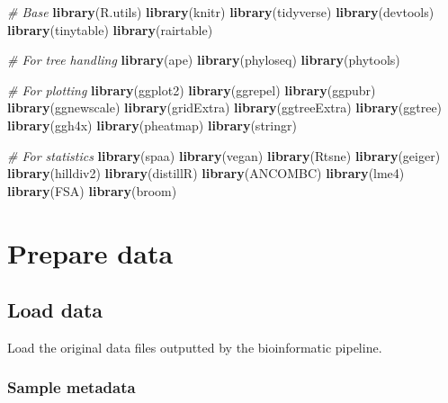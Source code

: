 \documentclass[
]{book}
\newenvironment{Shaded}{\begin{snugshade}}{\end{snugshade}}
\newcommand{\CommentTok}[1]{\textcolor[rgb]{0.56,0.35,0.01}{\textit{#1}}}
\newcommand{\FunctionTok}[1]{\textcolor[rgb]{0.13,0.29,0.53}{\textbf{#1}}}
\newcommand{\NormalTok}[1]{#1}
\begin{document}
\begin{Shaded}
\begin{Highlighting}[]
\CommentTok{\# Base}
\FunctionTok{library}\NormalTok{(R.utils)}
\FunctionTok{library}\NormalTok{(knitr)}
\FunctionTok{library}\NormalTok{(tidyverse)}
\FunctionTok{library}\NormalTok{(devtools)}
\FunctionTok{library}\NormalTok{(tinytable)}
\FunctionTok{library}\NormalTok{(rairtable)}

\CommentTok{\# For tree handling}
\FunctionTok{library}\NormalTok{(ape)}
\FunctionTok{library}\NormalTok{(phyloseq)}
\FunctionTok{library}\NormalTok{(phytools)}

\CommentTok{\# For plotting}
\FunctionTok{library}\NormalTok{(ggplot2)}
\FunctionTok{library}\NormalTok{(ggrepel)}
\FunctionTok{library}\NormalTok{(ggpubr)}
\FunctionTok{library}\NormalTok{(ggnewscale)}
\FunctionTok{library}\NormalTok{(gridExtra)}
\FunctionTok{library}\NormalTok{(ggtreeExtra)}
\FunctionTok{library}\NormalTok{(ggtree)}
\FunctionTok{library}\NormalTok{(ggh4x)}
\FunctionTok{library}\NormalTok{(pheatmap)}
\FunctionTok{library}\NormalTok{(stringr)}

\CommentTok{\# For statistics}
\FunctionTok{library}\NormalTok{(spaa)}
\FunctionTok{library}\NormalTok{(vegan)}
\FunctionTok{library}\NormalTok{(Rtsne)}
\FunctionTok{library}\NormalTok{(geiger)}
\FunctionTok{library}\NormalTok{(hilldiv2)}
\FunctionTok{library}\NormalTok{(distillR)}
\FunctionTok{library}\NormalTok{(ANCOMBC)}
\FunctionTok{library}\NormalTok{(lme4)}
\FunctionTok{library}\NormalTok{(FSA)}
\FunctionTok{library}\NormalTok{(broom)}
\end{Highlighting}
\end{Shaded}

\chapter{Prepare data}\label{prepare-data}

\section{Load data}\label{load-data}

Load the original data files outputted by the bioinformatic pipeline.

\subsection{Sample metadata}\label{sample-metadata}
\end{document}
